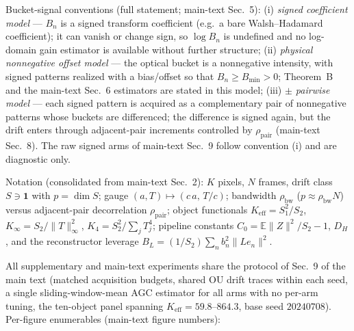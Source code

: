 \documentclass[journal,twoside]{IEEEtran}
\begin{document}
Bucket-signal conventions (full statement; main-text Sec.~5): (i) \emph{signed coefficient model} --- $B_n$ is a signed transform coefficient (e.g.\ a bare Walsh--Hadamard coefficient); it can vanish or change sign, so $\log B_n$ is undefined and no log-domain gain estimator is available without further structure; (ii) \emph{physical nonnegative offset model} --- the optical bucket is a nonnegative intensity, with signed patterns realized with a bias/offset so that $B_n\ge B_{\min}>0$; Theorem~B and the main-text Sec.~6 estimators are stated in this model; (iii) \emph{$\pm$ pairwise model} --- each signed pattern is acquired as a complementary pair of nonnegative patterns whose buckets are differenced; the difference is signed again, but the drift enters through adjacent-pair increments controlled by $\rho_{\mathrm{pair}}$ (main-text Sec.~8). The raw signed arms of main-text Sec.~9 follow convention (i) and are diagnostic only.

Notation (consolidated from main-text Sec.~2): $K$ pixels, $N$ frames, drift class $S\ni\mathbf 1$ with $p=\dim S$; gauge $(a,T)\mapsto(c\,a,\,T/c)$; bandwidth $\rho_{\mathrm{bw}}$ ($p\approx\rho_{\mathrm{bw}}N$) versus adjacent-pair decorrelation $\rho_{\mathrm{pair}}$; object functionals $K_{\mathrm{eff}}=S_1^2/S_2$, $K_\infty=S_2/\|T\|_\infty^2$, $K_4=S_2^2/\sum_j T_j^4$; pipeline constants $C_0=\mathbb{E}\|Z\|^2/S_2-1$, $D_H$, and the reconstructor leverage $B_L=(1/S_2)\sum_n b_n^2\|Le_n\|^2$.

All supplementary and main-text experiments share the protocol of Sec.~9 of the main text (matched acquisition budgets, shared OU drift traces within each seed, a single sliding-window-mean AGC estimator for all arms with no per-arm tuning, the ten-object panel spanning $K_{\mathrm{eff}}=59.8$--$864.3$, base seed $20240708$). Per-figure enumerables (main-text figure numbers):
\end{document}
